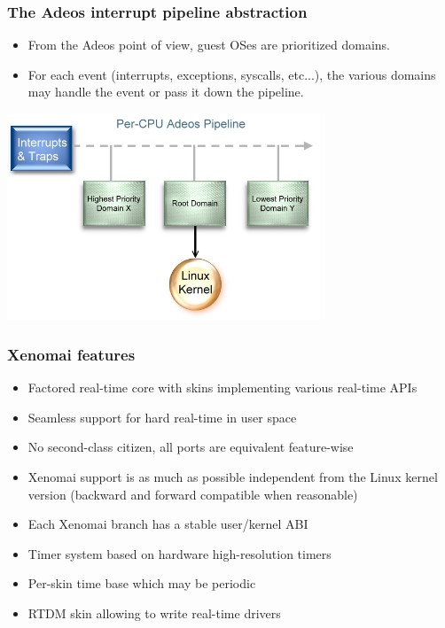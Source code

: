 \begin{frame}
  \frametitle{The Adeos interrupt pipeline abstraction}
  \begin{itemize}
  \item From the Adeos point of view, guest OSes are prioritized
    domains.
  \item For each event (interrupts, exceptions, syscalls, etc...), the
    various domains may handle the event or pass it down the pipeline.
  \end{itemize}
  \begin{center}
    \includegraphics[width=0.7\textwidth]{slides/sysdev-realtime/adeos-interrupt-pipeline1.jpg}
  \end{center}
\end{frame}

\begin{frame}
  \frametitle{Xenomai features}
  \begin{itemize}
  \item Factored real-time core with skins implementing various
    real-time APIs
  \item Seamless support for hard real-time in user space
  \item No second-class citizen, all ports are equivalent feature-wise
  \item Xenomai support is as much as possible independent from the
    Linux kernel version (backward and forward compatible when
    reasonable)
  \item Each Xenomai branch has a stable user/kernel ABI
  \item Timer system based on hardware high-resolution timers
  \item Per-skin time base which may be periodic
  \item RTDM skin allowing to write real-time drivers
  \end{itemize}
\end{frame}


